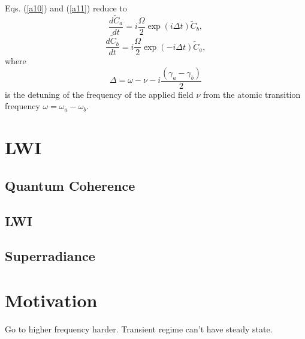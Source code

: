 Eqs. (\ref{a10}) and (\ref{a11}) reduce to
\begin{equation}
  \frac{d\tilde{C}_{a}}{dt}=i\frac{\Omega }{2}\exp \left( i\Delta t\right)
  \tilde{C}_{b},  \label{a12}
\end{equation}%
\begin{equation}
  \frac{d\tilde{C}_{b}}{dt}=i\frac{\Omega }{2}\exp \left( -i\Delta t\right)
  \tilde{C}_{a},  \label{a13}
\end{equation}%
where%
\begin{equation*}
  \Delta =\omega -\nu -i\frac{(\gamma _{a}-\gamma _{b})}{2}
\end{equation*}%
is the detuning of the frequency of the applied field $\nu $ from the atomic
transition frequency $\omega =\omega _{a}-\omega _{b}$.

\section{LWI}
\subsection{Quantum Coherence}
\subsection{LWI}
\subsection{Superradiance}
\section{Motivation}
Go to higher frequency harder.
Transient regime can't have steady state.

%
